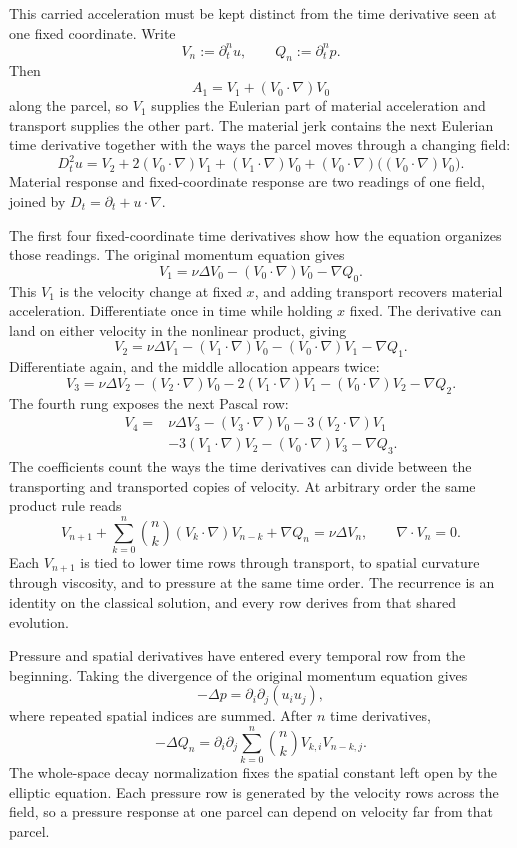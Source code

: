 This carried acceleration must be kept distinct from the time derivative seen at one fixed coordinate.
Write
\[
  V_n:=\partial_t^n u,
  \qquad
  Q_n:=\partial_t^n p.
\]
Then
\[
  A_1
  =
  V_1+(V_0\cdot\nabla)V_0
\]
along the parcel, so \(V_1\) supplies the Eulerian part of material acceleration and transport supplies the other part.
The material jerk contains the next Eulerian time derivative together with the ways the parcel moves through a changing field:
\[
  D_t^2u
  =
  V_2
  +2(V_0\cdot\nabla)V_1
  +(V_1\cdot\nabla)V_0
  +(V_0\cdot\nabla)\bigl((V_0\cdot\nabla)V_0\bigr).
\]
Material response and fixed-coordinate response are two readings of one field, joined by \(D_t=\partial_t+u\cdot\nabla\).


The first four fixed-coordinate time derivatives show how the equation organizes those readings.
The original momentum equation gives
\[
  V_1
  =
  \nu\Delta V_0
  -(V_0\cdot\nabla)V_0
  -\nabla Q_0.
\]
This \(V_1\) is the velocity change at fixed \(x\), and adding transport recovers material acceleration.
Differentiate once in time while holding \(x\) fixed.
The derivative can land on either velocity in the nonlinear product, giving
\[
  V_2
  =
  \nu\Delta V_1
  -(V_1\cdot\nabla)V_0
  -(V_0\cdot\nabla)V_1
  -\nabla Q_1.
\]
Differentiate again, and the middle allocation appears twice:
\[
  V_3
  =
  \nu\Delta V_2
  -(V_2\cdot\nabla)V_0
  -2(V_1\cdot\nabla)V_1
  -(V_0\cdot\nabla)V_2
  -\nabla Q_2.
\]
The fourth rung exposes the next Pascal row:
\[
  \begin{aligned}
  V_4
  ={}&
  \nu\Delta V_3
  -(V_3\cdot\nabla)V_0
  -3(V_2\cdot\nabla)V_1\\
  &-3(V_1\cdot\nabla)V_2
  -(V_0\cdot\nabla)V_3
  -\nabla Q_3.
  \end{aligned}
\]
The coefficients count the ways the time derivatives can divide between the transporting and transported copies of velocity.
At arbitrary order the same product rule reads
\[
  V_{n+1}
  +
  \sum_{k=0}^{n}
  \binom{n}{k}
  (V_k\cdot\nabla)V_{n-k}
  +
  \nabla Q_n
  =
  \nu\Delta V_n,
  \qquad
  \nabla\cdot V_n=0.
\]
Each \(V_{n+1}\) is tied to lower time rows through transport, to spatial curvature through viscosity, and to pressure at the same time order.
The recurrence is an identity on the classical solution, and every row derives from that shared evolution.


Pressure and spatial derivatives have entered every temporal row from the beginning.
Taking the divergence of the original momentum equation gives
\[
  -\Delta p
  =
  \partial_i\partial_j(u_i u_j),
\]
where repeated spatial indices are summed.
After \(n\) time derivatives,
\[
  -\Delta Q_n
  =
  \partial_i\partial_j
  \sum_{k=0}^{n}
  \binom{n}{k}
  V_{k,i}V_{n-k,j}.
\]
The whole-space decay normalization fixes the spatial constant left open by the elliptic equation.
Each pressure row is generated by the velocity rows across the field, so a pressure response at one parcel can depend on velocity far from that parcel.

